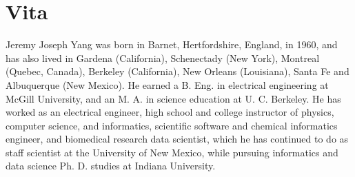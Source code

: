 \chapter*{Vita}

\doublespacing

Jeremy Joseph Yang was born in Barnet, Hertfordshire, England, in 1960, and has also lived in Gardena (California), Schenectady (New York), Montreal (Quebec, Canada), Berkeley (California), New Orleans (Louisiana), Santa Fe and Albuquerque (New Mexico). He earned a B. Eng. in electrical engineering at McGill University, and an M. A. in science education at U. C. Berkeley. He has worked as an electrical engineer, high school and college instructor of physics, computer science, and informatics, scientific software and chemical informatics engineer, and biomedical research data scientist, which he has continued to do as staff scientist at the University of New Mexico, while pursuing informatics and data science Ph. D. studies at Indiana University. 


